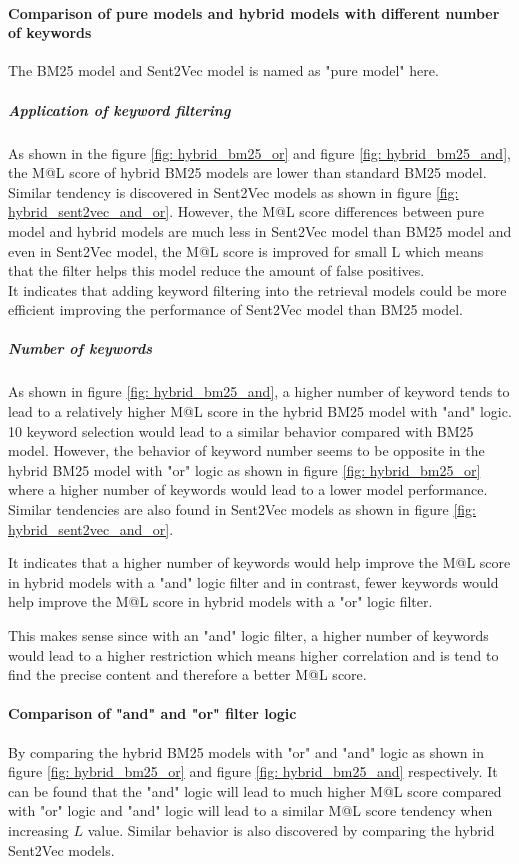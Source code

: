 \documentclass[10pt,a4paper,fleqn]{report}
\begin{document}
				\paragraph{Comparison of pure models and hybrid models with different number of keywords}
				The BM25 model and Sent2Vec model is named as "pure model" here.
				
				
				\subparagraph{Application of keyword filtering}
				As shown in the figure \ref{fig: hybrid_bm25_or} and figure \ref{fig: hybrid_bm25_and}, the M@L score of hybrid BM25 models are lower than standard BM25 model.
				Similar tendency is discovered in Sent2Vec models as shown in figure \ref{fig: hybrid_sent2vec_and_or}.
				However, the M@L score differences between pure model and hybrid models are much less in Sent2Vec model than BM25 model and even in Sent2Vec model, the M@L score is improved for small L which means that the filter helps this model reduce the amount of false positives.\\
				
				It indicates that adding keyword filtering into the retrieval models could be more efficient improving the performance of Sent2Vec model than BM25 model.
				
				\subparagraph{Number of keywords}
				As shown in figure \ref{fig: hybrid_bm25_and}, a higher number of keyword tends to lead to a relatively higher M@L score in the hybrid BM25 model with "and" logic. 10 keyword selection would lead to a similar behavior compared with BM25 model. However, the behavior of keyword number seems to be opposite in the hybrid BM25 model with "or" logic as shown in figure \ref{fig: hybrid_bm25_or}  where a higher number of keywords would lead to a lower model performance.
				Similar tendencies are also found in Sent2Vec models as shown in figure \ref{fig: hybrid_sent2vec_and_or}.
				
				It indicates that a higher number of keywords would help improve the M@L score in hybrid models with a "and" logic filter and in contrast, fewer keywords would help improve the M@L score in hybrid models with a "or" logic filter.
				
				This makes sense since with an "and" logic filter, a higher number of keywords would lead to a higher restriction which means higher correlation and is tend to find the precise content and therefore a better M@L score.
				
				\paragraph{Comparison of "and" and "or" filter logic}
				By comparing the hybrid BM25 models with "or" and "and" logic as shown in 
				figure \ref{fig: hybrid_bm25_or} and figure \ref{fig: hybrid_bm25_and} respectively. It can be found that the "and" logic will lead to much higher M@L score compared with "or" logic and "and" logic will lead to a similar M@L score tendency when increasing $L$ value. Similar behavior is also discovered by comparing the hybrid Sent2Vec models.
				
\end{document}
